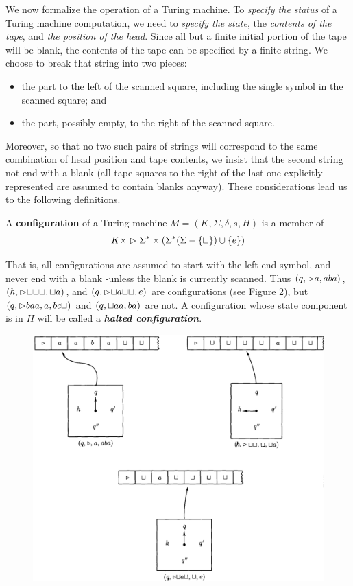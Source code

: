 We now formalize the operation of a Turing machine. To \textit{specify the status} of a Turing machine computation, we need to \textit{specify the state}, the \textit{contents of the tape}, and \textit{the position of the head}. Since all but a finite initial portion of the tape will be blank, the contents of the tape can be specified by a finite string. We choose to break that string into two pieces: 
\begin{itemize}
  \item the part to the left of the scanned square, including the single symbol in the scanned square; and 
  \item the part, possibly empty, to the right of the scanned square.
\end{itemize}
Moreover, so that no two such pairs of strings will correspond to the 
same combination of head position and tape contents, we insist that the second string not end with a blank (all tape squares to the right of the last one explicitly represented are assumed to contain blanks anyway). These considerations lead us to the following definitions.
\begin{definition}{}
  A \textbf{configuration} of a Turing machine $M = (K, \Sigma, \delta, s, H)$ is a member of 
  \begin{equation*}
    K \times \vartriangleright\Sigma^* \times (\Sigma^*(\Sigma - \{ \sqcup \}) \cup \{e\})
  \end{equation*}
\end{definition}
That is, all configurations are assumed to start with the left end symbol, and never end with a blank -unless the blank is currently scanned. Thus $(q, {\vartriangleright}a, aba)$, $(h, {\vartriangleright}{\sqcup}{\sqcup}{\sqcup}, {\sqcup}a)$, and $(q, {\vartriangleright}{\sqcup}a{\sqcup}{\sqcup}, e)$ are configurations (see Figure 2), but $(q, {\vartriangleright}baa, a, bc{\sqcup})$ and $(q, {\sqcup}aa, ba)$ are not. A configuration whose state component is in $H$ will be called a \textit{\textbf{halted configuration}}.
\begin{figure}[H]
  \centering
  \includegraphics[width=\linewidth]{img/fig-4.2.png}
  \caption{}
  \label{fig:4.2}
\end{figure}
